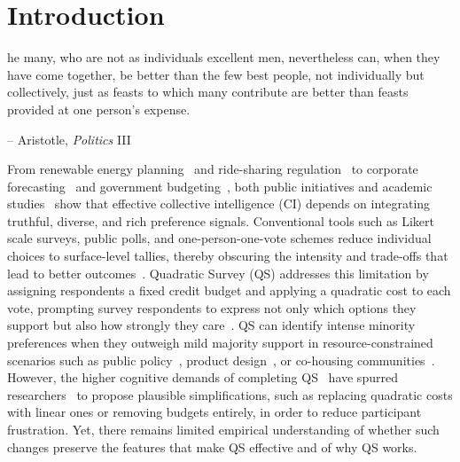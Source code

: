 \section{Introduction}

\begin{displayquote}
[T]he many, who are not as individuals excellent men, nevertheless can, when they have come together, be better than the few best people, not individually but collectively, just as feasts to which many contribute are better than feasts provided at one person's expense.

\begin{flushright}
-- Aristotle, \textit{Politics} III
\end{flushright}
\end{displayquote}

From renewable energy planning~\cite{fishkinConsultingPublicDeliberative2003} and ride-sharing regulation~\cite{hsiao2018vtaiwan} to corporate forecasting~\cite{cowgill2015corporate} and government budgeting~\cite{desousasantosParticipatoryBudgetingPorto1998}, both public initiatives and academic studies~\cite{woolley2010evidence, centola2022network, krosnick1999survey, weylPluralityFutureCollaborative2024} show that effective collective intelligence (CI) depends on integrating truthful, diverse, and rich preference signals. Conventional tools such as Likert scale surveys, public polls, and one-person-one-vote schemes reduce individual choices to surface-level tallies, thereby obscuring the intensity and trade-offs that lead to better outcomes~\cite{quarfoot2017quadratic,posner2017quadratic, krosnick1999survey}. Quadratic Survey (QS) addresses this limitation by assigning respondents a fixed credit budget and applying a quadratic cost to each vote, prompting survey respondents to express not only which options they support but also how strongly they care~\cite{chengCanShowWhat2021, quarfoot2017quadratic, cavaille2024cares}. QS can identify intense minority preferences when they outweigh mild majority support in resource-constrained scenarios such as public policy~\cite{chengCanShowWhat2021, quarfoot2017quadratic}, product design~\cite{chengCanShowWhat2021}, or co-housing communities~\cite{karpinskiPotentialQuadraticVoting2025}. However, the higher cognitive demands of completing QS~\cite{chengOrganizeThenVote2025} have spurred researchers~\cite{cavaille2024cares, chengCanShowWhat2021} to propose plausible simplifications, such as replacing quadratic costs with linear ones or removing budgets entirely, in order to reduce participant frustration. Yet, there remains limited empirical understanding of whether such changes preserve the features that make QS effective and of why QS works.


